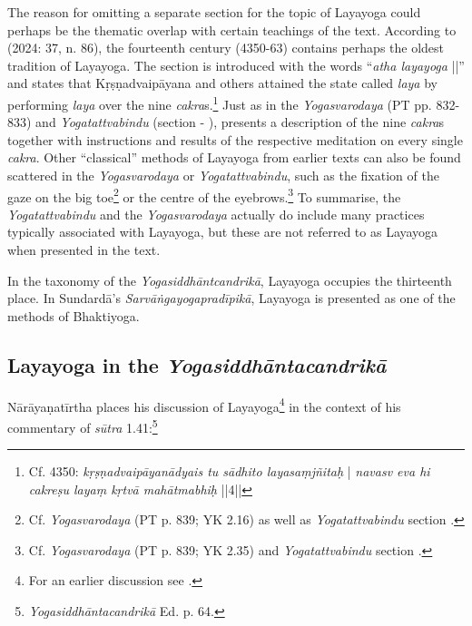  The reason for omitting a separate section for the topic of Layayoga could perhaps be the thematic overlap with certain teachings of the text. According to \citeauthor{amaraugha2024} (2024: 37, n. 86), the fourteenth century  (4350-63) contains perhaps the oldest tradition of Layayoga. The section is introduced with the words ``\textit{atha layayoga} ||'' and states that Kṛṣṇadvaipāyana and others attained the state called \textit{laya} by performing \textit{laya} over the nine \textit{cakra}s.\footnote{Cf.  4350: \textit{kṛṣṇadvaipāyanādyais tu sādhito layasaṃjñitaḥ} | \textit{navasv eva hi cakreṣu layaṃ kṛtvā mahātmabhiḥ} ||4||} Just as in the \textit{Yogasvarodaya} (PT pp. 832-833) and \textit{Yogatattvabindu} (section  - ),  presents a  description of the nine \textit{cakra}s together with instructions and results of the respective meditation on every single \textit{cakra}. Other ``classical'' methods of Layayoga from earlier texts can also be found scattered in the \textit{Yogasvarodaya} or \textit{Yogatattvabindu}, such as the fixation of the gaze on the big toe\footnote{Cf. \textit{Yogasvarodaya} (PT p. 839; YK 2.16) as well as \textit{Yogatattvabindu} section .} or the centre of the eyebrows.\footnote{Cf. \textit{Yogasvarodaya} (PT p. 839; YK 2.35) and \textit{Yogatattvabindu} section .} To summarise, the \textit{Yogatattvabindu} and the \textit{Yogasvarodaya} actually do include many practices typically associated with Layayoga, but these are not referred to as Layayoga when presented in the text. 
 
In the taxonomy of the \textit{Yogasiddhāntcandrikā}, Layayoga occupies the thirteenth place. In Sundardā's \textit{Sarvāṅgayogapradīpikā}, Layayoga is presented as one of the methods of Bhaktiyoga.

\subsection{Layayoga in the \textit{Yogasiddhāntacandrikā}}

Nārāyaṇatīrtha places his discussion of Layayoga\footnote{For an earlier discussion see \citeauthor[2004: 85-89]{penna2004}.} in the context of his commentary of \textit{sūtra} 1.41:\footnote{\textit{Yogasiddhāntacandrikā} Ed. p. 64.} 

